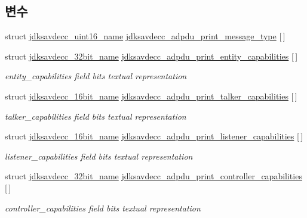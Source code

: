 \subsection*{변수}
\begin{DoxyCompactItemize}
\item 
struct \hyperlink{structjdksavdecc__uint16__name}{jdksavdecc\+\_\+uint16\+\_\+name} \hyperlink{group__adp__print_gad844d4559639ba7c2ff0faa49d972d20}{jdksavdecc\+\_\+adpdu\+\_\+print\+\_\+message\+\_\+type} \mbox{[}$\,$\mbox{]}
\item 
struct \hyperlink{structjdksavdecc__32bit__name}{jdksavdecc\+\_\+32bit\+\_\+name} \hyperlink{group__adp__print_ga7983dab1767e3e1cbdf1c8871ffc93b3}{jdksavdecc\+\_\+adpdu\+\_\+print\+\_\+entity\+\_\+capabilities} \mbox{[}$\,$\mbox{]}
\begin{DoxyCompactList}\small\item\em entity\+\_\+capabilities field bits textual representation \end{DoxyCompactList}\item 
struct \hyperlink{structjdksavdecc__16bit__name}{jdksavdecc\+\_\+16bit\+\_\+name} \hyperlink{group__adp__print_ga0aef8e9a7f6f1f06031a411798f7718e}{jdksavdecc\+\_\+adpdu\+\_\+print\+\_\+talker\+\_\+capabilities} \mbox{[}$\,$\mbox{]}
\begin{DoxyCompactList}\small\item\em talker\+\_\+capabilities field bits textual representation \end{DoxyCompactList}\item 
struct \hyperlink{structjdksavdecc__16bit__name}{jdksavdecc\+\_\+16bit\+\_\+name} \hyperlink{group__adp__print_ga351e524043eb2b40b15283777be6ad5a}{jdksavdecc\+\_\+adpdu\+\_\+print\+\_\+listener\+\_\+capabilities} \mbox{[}$\,$\mbox{]}
\begin{DoxyCompactList}\small\item\em listener\+\_\+capabilities field bits textual representation \end{DoxyCompactList}\item 
struct \hyperlink{structjdksavdecc__32bit__name}{jdksavdecc\+\_\+32bit\+\_\+name} \hyperlink{group__adp__print_ga338d7b70fd9a2b2177827cab7867c279}{jdksavdecc\+\_\+adpdu\+\_\+print\+\_\+controller\+\_\+capabilities} \mbox{[}$\,$\mbox{]}
\begin{DoxyCompactList}\small\item\em controller\+\_\+capabilities field bits textual representation \end{DoxyCompactList}\end{DoxyCompactItemize}



